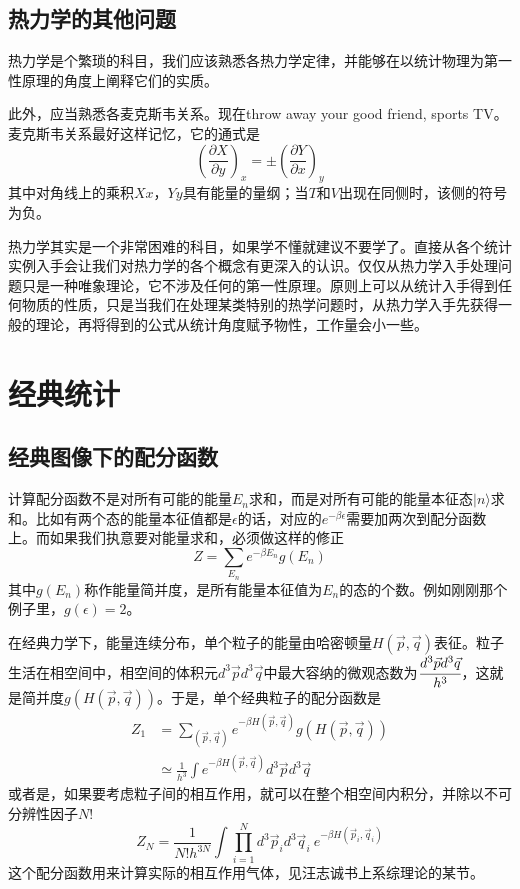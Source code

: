 \documentclass[a4paper,11pt]{ctexart}
\newcommand{\beq}{\begin{equation}}
\newcommand{\eeq}{\end{equation}}
\newcommand{\bea}{\begin{equation}\begin{aligned}}
\newcommand{\eea}{\end{aligned}\end{equation}}
\def\pfrac#1#2#3{\left(\frac{\partial #1}{\partial #2}\right)_{#3}}
\begin{document}
\subsection{热力学的其他问题}
热力学是个繁琐的科目，我们应该熟悉各热力学定律，并能够在以统计物理为第一性原理的角度上阐释它们的实质。
\par
此外，应当熟悉各麦克斯韦关系。现在throw away your good friend, sports TV。麦克斯韦关系最好这样记忆，它的通式是
\beq
\pfrac{X}{y}{x} = \pm \pfrac{Y}{x}{y}
\eeq
其中对角线上的乘积$Xx$，$Yy$具有能量的量纲；当$T$和$V$出现在同侧时，该侧的符号为负。
\par
热力学其实是一个非常困难的科目，如果学不懂就建议不要学了。直接从各个统计实例入手会让我们对热力学的各个概念有更深入的认识。仅仅从热力学入手处理问题只是一种唯象理论，它不涉及任何的第一性原理。原则上可以从统计入手得到任何物质的性质，只是当我们在处理某类特别的热学问题时，从热力学入手先获得一般的理论，再将得到的公式从统计角度赋予物性，工作量会小一些。

\section{经典统计}
\subsection{经典图像下的配分函数}
计算配分函数不是对所有可能的能量$E_n$求和，而是对所有可能的能量本征态$|n\rangle$求和。比如有两个态的能量本征值都是$\epsilon$的话，对应的$e^{-\beta \epsilon}$需要加两次到配分函数上。而如果我们执意要对能量求和，必须做这样的修正
\beq
Z = \sum_{E_n} e^{-\beta E_n} g(E_n)
\eeq
其中$g(E_n)$称作能量简并度，是所有能量本征值为$E_n$的态的个数。例如刚刚那个例子里，$g(\epsilon) = 2$。
\par
在经典力学下，能量连续分布，单个粒子的能量由哈密顿量$H(\vec{p},\vec{q})$表征。粒子生活在相空间中，相空间的体积元$d^3 \vec{p} d^3 \vec{q}$中最大容纳的微观态数为$\cfrac{d^3 \vec{p} d^3 \vec{q}}{h^3}$，这就是简并度$g(H(\vec{p},\vec{q}))$。于是，单个经典粒子的配分函数是
\bea
Z_1 &= \sum_{(\vec{p},\vec{q})}  e^{-\beta H(\vec{p},\vec{q})} g(H(\vec{p},\vec{q})) \\
&\simeq \frac{1}{h^3} \int e^{-\beta H(\vec{p},\vec{q})} d^3 \vec{p} d^3 \vec{q}
\eea
或者是，如果要考虑粒子间的相互作用，就可以在整个相空间内积分，并除以不可分辨性因子$N!$
\beq
Z_N = \frac{1}{N! h^{3N}} \int \prod_{i=1}^N d^3 \vec{p}_i d^3 \vec{q}_i \ e^{-\beta H(\vec{p}_i,\vec{q}_i)}
\eeq
这个配分函数用来计算实际的相互作用气体，见汪志诚书上系综理论的某节。
\end{document}
